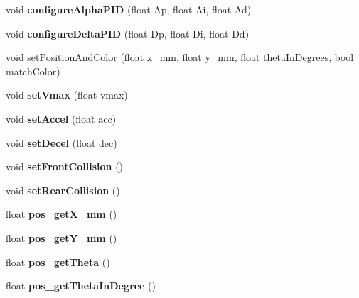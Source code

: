 \begin{DoxyCompactItemize}
\item 
\mbox{\label{classAPF9328AsservExtended_a6aa98443067d780cd1864a3257eb0ef4}} 
void {\bfseries configure\+Alpha\+P\+ID} (float Ap, float Ai, float Ad)
\item 
\mbox{\label{classAPF9328AsservExtended_a47771f4f1c165b65e2db414788a3a69a}} 
void {\bfseries configure\+Delta\+P\+ID} (float Dp, float Di, float Dd)
\item 
void \hyperlink{classAPF9328AsservExtended_ad4c9b6504309467b4f1c820fb3202b12}{set\+Position\+And\+Color} (float x\+\_\+mm, float y\+\_\+mm, float theta\+In\+Degrees, bool match\+Color)
\item 
\mbox{\label{classAPF9328AsservExtended_a04d478f4abd9bad1669a6a2ba478f067}} 
void {\bfseries set\+Vmax} (float vmax)
\item 
\mbox{\label{classAPF9328AsservExtended_a244dc619da447c1d31c1a0b03b6207ca}} 
void {\bfseries set\+Accel} (float acc)
\item 
\mbox{\label{classAPF9328AsservExtended_a82857613a3aecd83ce40528babc565ff}} 
void {\bfseries set\+Decel} (float dec)
\item 
\mbox{\label{classAPF9328AsservExtended_aa86b14c373234f21ba44b1a6f7c4f3ed}} 
void {\bfseries set\+Front\+Collision} ()
\item 
\mbox{\label{classAPF9328AsservExtended_ae918d1c92f0f8acd25351f41d5ead8e8}} 
void {\bfseries set\+Rear\+Collision} ()
\item 
\mbox{\label{classAPF9328AsservExtended_a66af304d9d1b285594c21356bea17d49}} 
float {\bfseries pos\+\_\+get\+X\+\_\+mm} ()
\item 
\mbox{\label{classAPF9328AsservExtended_a5d1e08d7288e1850899705626d826508}} 
float {\bfseries pos\+\_\+get\+Y\+\_\+mm} ()
\item 
\mbox{\label{classAPF9328AsservExtended_ab7312a711b88f3cb55fe42c6bbfd2edd}} 
float {\bfseries pos\+\_\+get\+Theta} ()
\item 
\mbox{\label{classAPF9328AsservExtended_a97d08816e43054d43cdab58e1e826d12}} 
float {\bfseries pos\+\_\+get\+Theta\+In\+Degree} ()
\end{DoxyCompactItemize}
